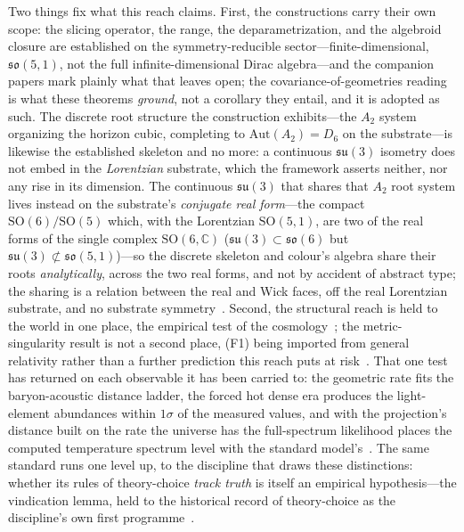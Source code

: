 \documentclass[11pt,a4paper]{article}
\theoremstyle{plain}
\theoremstyle{definition}
\theoremstyle{remark}
\begin{document}
Two things fix what this reach claims. First, the constructions carry their own scope: the slicing operator, the range, the deparametrization, and the algebroid closure are established on the symmetry-reducible sector---finite-dimensional, $\mathfrak{so}(5,1)$, not the full infinite-dimensional Dirac algebra---and the companion papers mark plainly what that leaves open; the covariance-of-geometries reading is what these theorems \emph{ground}, not a corollary they entail, and it is adopted as such. The discrete root structure the construction exhibits---the $A_2$ system organizing the horizon cubic, completing to $\mathrm{Aut}(A_2)=D_6$ on the substrate---is likewise the established skeleton and no more: a continuous $\mathfrak{su}(3)$ isometry does not embed in the \emph{Lorentzian} substrate, which the framework asserts neither, nor any rise in its dimension. The continuous $\mathfrak{su}(3)$ that shares that $A_2$ root system lives instead on the substrate's \emph{conjugate real form}---the compact $\mathrm{SO}(6)/\mathrm{SO}(5)$ which, with the Lorentzian $\mathrm{SO}(5,1)$, are two of the real forms of the single complex $\mathrm{SO}(6,\mathbb{C})$ ($\mathfrak{su}(3)\subset\mathfrak{so}(6)$ but $\mathfrak{su}(3)\not\subset\mathfrak{so}(5,1)$)---so the discrete skeleton and colour's algebra share their roots \emph{analytically}, across the two real forms, and not by accident of abstract type; the sharing is a relation between the real and Wick faces, off the real Lorentzian substrate, and no substrate symmetry~\cite{JanzenAlgebroid,JanzenBoundary,JanzenGeometricCore}. Second, the structural reach is held to the world in one place, the empirical test of the cosmology~\cite{JanzenCRcosmology}; the metric-singularity result is not a second place, (F1) being imported from general relativity rather than a further prediction this reach puts at risk~\cite{JanzenBHcausality}. That one test has returned on each observable it has been carried to: the geometric rate fits the baryon-acoustic distance ladder, the forced hot dense era produces the light-element abundances within $1\sigma$ of the measured values, and with the projection's distance built on the rate the universe has the full-spectrum likelihood places the computed temperature spectrum level with the standard model's~\cite{JanzenCRcosmology,JanzenCosmogenesis}. The same standard runs one level up, to the discipline that draws these distinctions: whether its rules of theory-choice \emph{track truth} is itself an empirical hypothesis---the vindication lemma, held to the historical record of theory-choice as the discipline's own first programme~\cite{JanzenShadowExistence}.
\end{document}
